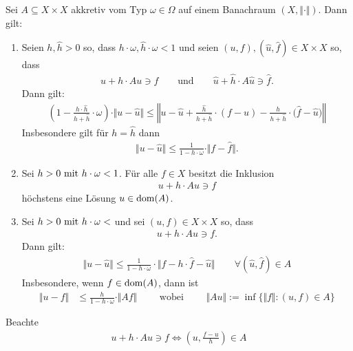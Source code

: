 \begin{theorem}\enter
	Sei $A\subseteq X\times X$ akkretiv vom Typ $\omega\in\Omega$ auf einem Banachraum $(X,\Vert\cdot\Vert)$. 
	Dann gilt:
	\begin{enumerate}[label=(\alph*)]
		\item Seien $h,\hat{h}>0$ so, dass $h\cdot\omega,\hat{h}\cdot\omega<1$ und seien $(u,f),(\hat{u},\hat{f})\in X\times X$ so, dass 
		\begin{align*}
			u+h\cdot Au\ni f\qquad\text{und}\qquad\hat{u}+\hat{h}\cdot A\hat{u}\ni\hat{f}.
		\end{align*}
		Dann gilt:
		\begin{align*}
			\left(1-\frac{h\cdot\hat{h}}{h+\hat{h}}\cdot\omega\right)\cdot\Vert u-\hat{u}\Vert
			\leq
			\left\Vert u-\hat{u}+\frac{\hat{h}}{h+\hat{h}}\cdot(f-u)-\frac{h}{h+\hat{h}}\cdot\big(\hat{f}-\hat{u}\big)\right\Vert
		\end{align*}
		Insbesondere gilt für $h=\hat{h}$ dann
		\begin{align*}
			\Vert u-\hat{u}\Vert
			\leq
			\frac{1}{1-h\cdot\omega}\cdot\Vert f-\hat{f}\Vert.
		\end{align*}
		\item Sei $h>0\mit h\cdot \omega<1$. Für alle $f\in X$ besitzt die Inklusion
		\begin{align*}
			u+h\cdot Au\ni f
		\end{align*}
		höchstens eine Lösung $u\in\dom(A)$.
		\item Sei $h>0\mit h\cdot\omega<$ und sei $(u,f)\in X\times X$ so, dass 
		\begin{align*}
			u+h\cdot Au\ni f.
		\end{align*}
		Dann gilt:
		\begin{align*}
			\Vert u-\hat{u}\Vert
			\leq
			\frac{1}{1-h\cdot\omega}\cdot\big\Vert f-h\cdot\hat{f}-\hat{u}\big\Vert
			\qquad
			\forall(\hat{u},\hat{f})\in A
		\end{align*}
		Insbesondere, wenn $f\in\dom(A)$, dann ist
		\begin{align*}
			\Vert u-f\Vert
			&\leq
			\frac{h}{1-h\cdot\omega}\cdot\Vert Af\Vert
			\qquad
			\text{ wobei }
			\qquad
			\Vert Au\Vert:=\inf\big\lbrace\Vert f\Vert:(u,f)\in A\big\rbrace
		\end{align*}
	\end{enumerate}
\end{theorem}

\begin{bemerkung}
	Beachte
	\begin{align*}
		u+h\cdot Au\ni f\Longleftrightarrow\left(u,\frac{f-u}{h}\right)\in A
	\end{align*}
\end{bemerkung}


